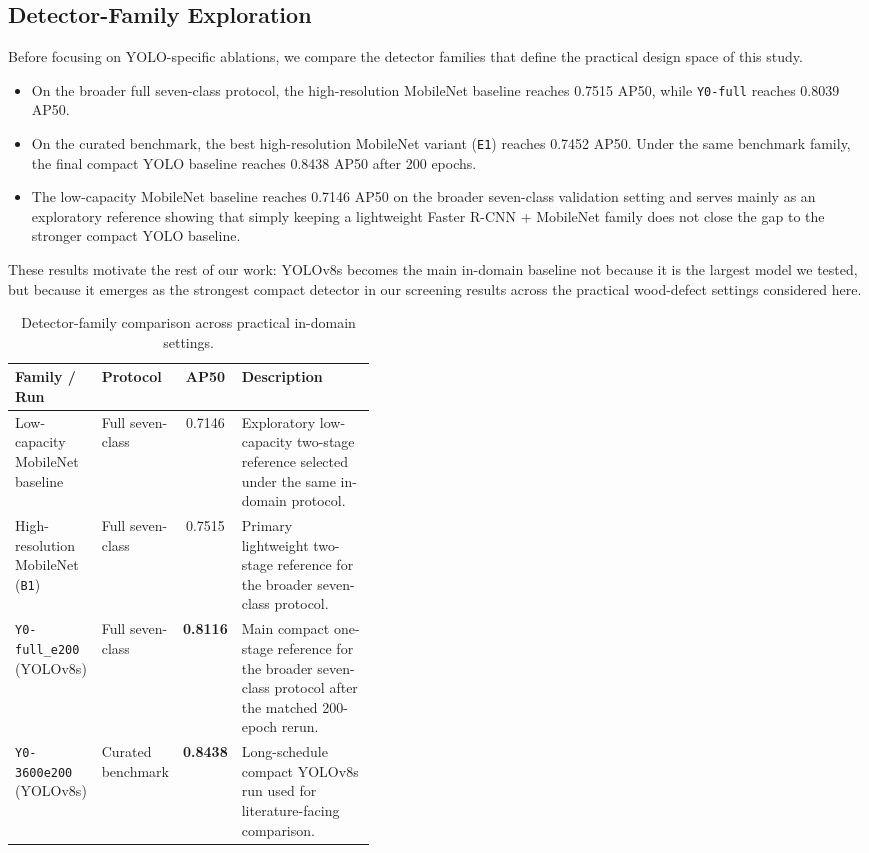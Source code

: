 \documentclass[10pt,a4paper]{article}
\newcommand{\best}[1]{\textbf{#1}}
\begin{document}
\subsection{Detector-Family Exploration}
\label{sec:family-results}

Before focusing on YOLO-specific ablations, we compare the detector families that define the practical design space of this study.

\begin{itemize}[leftmargin=1.5em]
  \item On the broader full seven-class protocol, the high-resolution MobileNet baseline reaches 0.7515 AP50, while \texttt{Y0-full} reaches 0.8039 AP50.
  \item On the curated benchmark, the best high-resolution MobileNet variant (\texttt{E1}) reaches 0.7452 AP50. Under the same benchmark family, the final compact YOLO baseline reaches 0.8438 AP50 after 200 epochs.
  \item The low-capacity MobileNet baseline reaches 0.7146 AP50 on the broader seven-class validation setting and serves mainly as an exploratory reference showing that simply keeping a lightweight Faster R-CNN + MobileNet family does not close the gap to the stronger compact YOLO baseline.
\end{itemize}

These results motivate the rest of our work: YOLOv8s becomes the main in-domain baseline not because it is the largest model we tested, but because it emerges as the strongest compact detector in our screening results across the practical wood-defect settings considered here.

\begin{table}[b]
  \centering
  \caption{Detector-family comparison across practical in-domain settings.}
  \label{tab:family-results}
  \footnotesize
  \setlength{\tabcolsep}{4pt}
  \begin{tabularx}{\linewidth}{>{\raggedright\arraybackslash}p{0.24\linewidth} >{\raggedright\arraybackslash}p{0.18\linewidth} c X}
    \toprule
    Family / Run & Protocol & AP50 & Description \\
    \midrule
    Low-capacity MobileNet baseline & Full seven-class & 0.7146 & Exploratory low-capacity two-stage reference selected under the same in-domain protocol. \\
    High-resolution MobileNet (\texttt{B1}) & Full seven-class & 0.7515 & Primary lightweight two-stage reference for the broader seven-class protocol. \\
    \texttt{Y0-full\_e200} (YOLOv8s) & Full seven-class & \best{0.8116} & Main compact one-stage reference for the broader seven-class protocol after the matched 200-epoch rerun. \\
    \texttt{Y0-3600e200} (YOLOv8s) & Curated benchmark & \best{0.8438} & Long-schedule compact YOLOv8s run used for literature-facing comparison. \\
    \bottomrule
  \end{tabularx}
\end{table}
\end{document}
